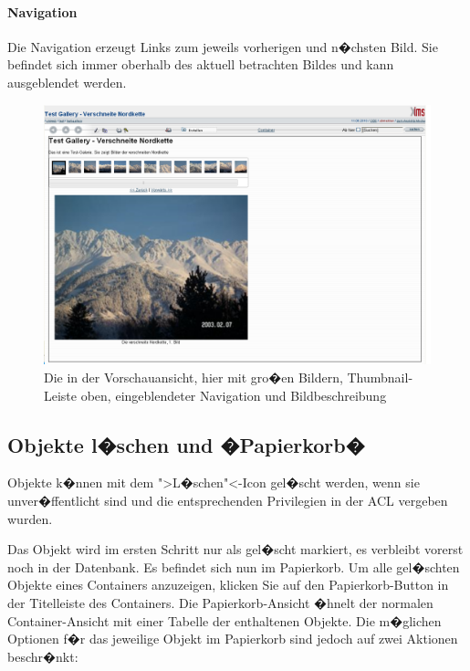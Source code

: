 \paragraph{Navigation}
Die Navigation erzeugt Links zum jeweils vorherigen und n�chsten Bild. Sie befindet sich immer oberhalb des aktuell betrachten Bildes und kann ausgeblendet werden.


\begin{figure}[!ht]
  \centering
  \includegraphics[width=\textwidth]{./images/gallery-preview.png}
  \caption{Die  in der Vorschauansicht, hier mit gro�en Bildern, Thumbnail-Leiste oben, eingeblendeter Navigation und Bildbeschreibung}
  \label{fig:gallery-preview}
\end{figure}

\subsection{Objekte l�schen und �Papierkorb�}
\label{delete}

Objekte k�nnen mit dem ">L�schen"<-Icon gel�scht werden, wenn sie unver�ffentlicht sind
und die entsprechenden Privilegien in der ACL vergeben wurden.

Das Objekt wird im ersten Schritt nur als gel�scht markiert, es verbleibt vorerst noch
in der Datenbank. Es befindet sich nun im Papierkorb. Um alle gel�schten Objekte eines Containers anzuzeigen, klicken Sie auf den Papierkorb-Button in der Titelleiste des Containers. Die Papierkorb-Ansicht �hnelt der normalen Container-Ansicht mit einer Tabelle der enthaltenen Objekte. Die m�glichen Optionen f�r das jeweilige Objekt im Papierkorb sind jedoch auf zwei Aktionen beschr�nkt:

